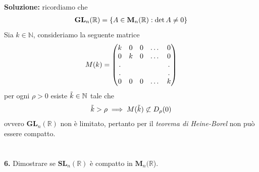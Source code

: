 \documentclass{article}
\begin{document}
\textbf{Soluzione:} ricordiamo che
\begin{gather}
    \mathbf{GL}_n(\mathbb{R}) = \{ A \in \mathbf{M}_n(\mathbb{R}) : \det A \neq 0 \} \notag
\end{gather}
Sia $k \in \mathbb{N}$, consideriamo la seguente matrice
\begin{gather}
    M(k) = \begin{pmatrix}
        k & 0 & 0 & \dots & 0 \\
        0 & k & 0 & \dots & 0 \\
        . & & & & . \\
        . & & & & . \\
        0 & 0 & 0 & \dots & k
    \end{pmatrix} \notag
\end{gather}
per ogni $\rho > 0$ esiste $\Tilde{k} \in \mathbb{N}$ tale che
\begin{gather}
    \Tilde{k} > \rho \implies M(\Tilde{k}) \not\subset D_\rho(0) \notag
\end{gather}
ovvero $\mathbf{GL}_n(\mathbb{R})$ non è limitato, pertanto per il \textit{teorema di Heine-Borel} non può essere compatto. \\ \\ \\
\textbf{6.} Dimostrare se $\textbf{SL}_n(\mathbb{R})$ è compatto in $\mathbf{M}_n(\mathbb{R}$). \\
\end{document}
